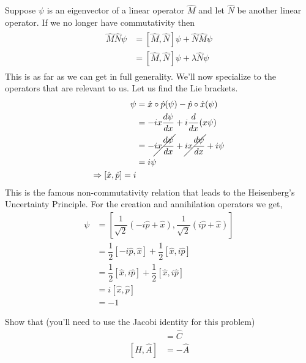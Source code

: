 Suppose $\psi$ is an eigenvector of a linear operator $\hat{M}$ and let $\hat{N}$ be another linear operator. If we no longer have commutativity then
\begin{align}
	\label{eq:commutator_eigenvalue}
	\begin{split}
		\hat{M} \hat {N} \psi
		&= [\hat{M}, \hat{N}] \psi + \hat{N} \hat{M} \psi \\
		&= [\hat{M}, \hat{N}] \psi + \lambda \hat{N}  \psi
	\end{split}
\end{align}
This is as far as we can get in full generality. We'll now specialize to the operators that are relevant to us. Let us find the Lie brackets.
\begin{align*}
	[\hat{x}, \hat{p}] \psi
	&= \hat{x} \circ \hat{p} (\psi) - \hat{p} \circ \hat{x} (\psi) \\
	&= -i x \dfrac{d \psi}{dx} + i \dfrac{d}{dx}(x \psi) \\
	&= -\cancel{i x \dfrac{d \psi}{dx}} + \cancel{i x\dfrac{d\psi}{dx}} + i \psi \\
	&= i \psi \\
	\Rightarrow [\hat{x}, \hat{p}] = i
\end{align*}
This is the famous non-commutativity relation that leads to the Heisenberg's Uncertainty Principle. For the creation and annihilation operators we get,
\begin{align*}
	[\hat{C}, \hat{A}] \psi
	&= \left[\dfrac{1}{\sqrt{2}}\left(-i \hat{p} + \hat{x}\right), \dfrac{1}{\sqrt{2}}\left(i \hat{p} + \hat{x}\right)\right] \\
	&= \dfrac{1}{2}[-i \hat{p}, \hat{x}] + \dfrac{1}{{2}}[\hat{x},i \hat{p}] \\
	&= \dfrac{1}{{2}}[\hat{x},i \hat{p}] + \dfrac{1}{{2}}[\hat{x},i \hat{p}] \\
	&= i [\hat{x},\hat{p}] \\
	&= -1
\end{align*}

\begin{ques}
	\label{q:commutivity_relations}
	Show that (you'll need to use the Jacobi identity for this problem)
	\begin{align*}
		[\hat{H}, \hat{C}] &= \hat{C} \\
		[\hat{H}, \hat{A}] &= -\hat{A}
\end{align*}
\end{ques}

